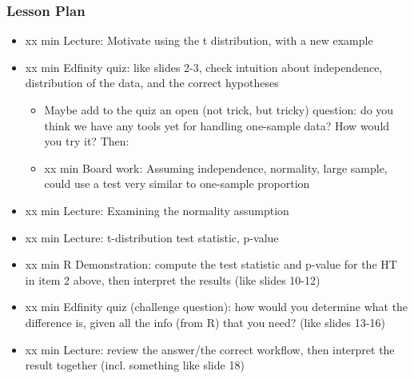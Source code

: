 \begin{frame}
    \frametitle{Lesson Plan}
    \begin{itemize}
        \item xx min Lecture: Motivate using the t distribution, with a new example
        \item xx min Edfinity quiz: like slides 2-3, check intuition about independence, distribution of the data, and the correct hypotheses
        \begin{itemize} 
            \item Maybe add to the quiz an open (not trick, but tricky) question: do you think we have any tools yet for handling one-sample data? How would you try it? Then:
            \item xx min Board work: Assuming independence, normality, large sample, could use a test very similar to one-sample proportion
        \end{itemize}
        \item xx min Lecture: Examining the normality assumption
        \item xx min Lecture: t-distribution test statistic, p-value
        \item xx min R Demonstration: compute the test statistic and p-value for the HT in item 2 above, then interpret the results (like slides 10-12)
        \item xx min Edfinity quiz (challenge question): how would you determine what the difference is, given all the info (from R) that you need? (like slides 13-16)
        \item xx min Lecture: review the answer/the correct workflow, then interpret the result together (incl. something like slide 18)
    \end{itemize}
\end{frame}
            
